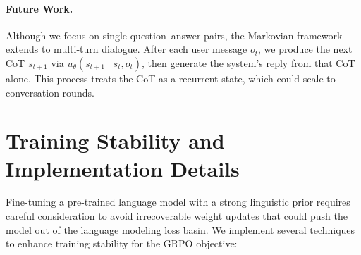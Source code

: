 \documentclass{article} %
\begin{document}
\paragraph{Future Work.}
Although we focus on single question–answer pairs, the Markovian framework extends to multi-turn dialogue. After each user message $o_t$, we produce the next CoT $s_{t+1}$ via $u_\theta(s_{t+1}\mid s_t,o_t)$, then generate the system's reply from that CoT alone. This process treats the CoT as a recurrent state, which could scale to conversation rounds.




\appendix
\section{Training Stability and Implementation Details}
\label{subsec:stability}
Fine-tuning a pre-trained language model with a strong linguistic prior requires careful consideration to avoid irrecoverable weight updates that could push the model out of the language modeling loss basin. We implement several techniques to enhance training stability for the GRPO objective:
\end{document}
